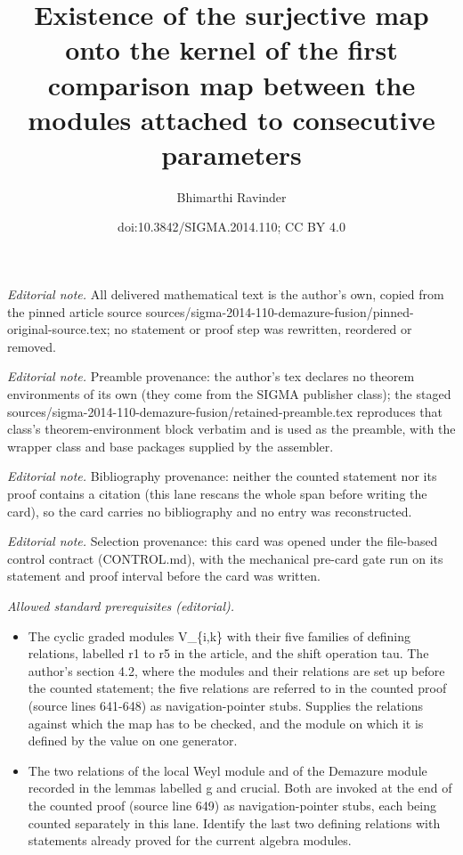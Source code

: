 \documentclass[10pt,a4paper]{amsart}
\title{Existence of the surjective map onto the kernel of the first comparison map between the modules attached to consecutive parameters}
\author{Bhimarthi Ravinder}
\date{doi:10.3842/SIGMA.2014.110; CC BY 4.0}
\begin{document}
\maketitle
\noindent\textit{Editorial note.} All delivered mathematical text is the author's own, copied from the pinned article source sources/sigma-2014-110-demazure-fusion/pinned-original-source.tex; no statement or proof step was rewritten, reordered or removed.\par\medskip
\noindent\textit{Editorial note.} Preamble provenance: the author's tex declares no theorem environments of its own (they come from the SIGMA publisher class); the staged sources/sigma-2014-110-demazure-fusion/retained-preamble.tex reproduces that class's theorem-environment block verbatim and is used as the preamble, with the wrapper class and base packages supplied by the assembler.\par\medskip
\noindent\textit{Editorial note.} Bibliography provenance: neither the counted statement nor its proof contains a citation (this lane rescans the whole span before writing the card), so the card carries no bibliography and no entry was reconstructed.\par\medskip
\noindent\textit{Editorial note.} Selection provenance: this card was opened under the file-based control contract (CONTROL.md), with the mechanical pre-card gate run on its statement and proof interval before the card was written.\par\medskip
\noindent\textit{Allowed standard prerequisites (editorial).}\begin{itemize}
\item The cyclic graded modules V\_\{i,k\} with their five families of defining relations, labelled r1 to r5 in the article, and the shift operation tau. The author's section 4.2, where the modules and their relations are set up before the counted statement; the five relations are referred to in the counted proof (source lines 641-648) as navigation-pointer stubs. Supplies the relations against which the map has to be checked, and the module on which it is defined by the value on one generator.
\item The two relations of the local Weyl module and of the Demazure module recorded in the lemmas labelled g and crucial. Both are invoked at the end of the counted proof (source line 649) as navigation-pointer stubs, each being counted separately in this lane. Identify the last two defining relations with statements already proved for the current algebra modules.
\end{itemize}\medskip
\end{document}
